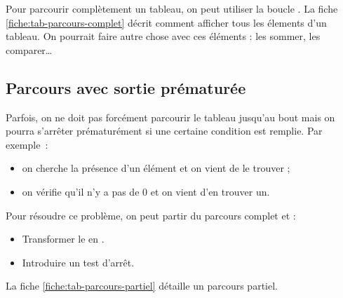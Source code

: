 			Pour parcourir complètement un tableau, 
			on peut utiliser la boucle .
			La fiche \vref{fiche:tab-parcours-complet}
			décrit comment afficher tous les élements d'un tableau.
			On pourrait faire autre chose avec ces éléments :
			les sommer, les comparer\dots
		
		\subsection{Parcours avec sortie prématurée}
		
			Parfois, on ne doit pas forcément parcourir 
			le tableau jusqu'au bout
			mais on pourra s'arrêter prématurément 
			si une certaine condition est remplie.
			Par exemple~:
			\begin{itemize}
			\item on cherche la présence d'un élément et on vient de le trouver ;
			\item on vérifie qu'il n'y a pas de $0$ et on vient d'en trouver un.
			\end{itemize}

			Pour résoudre ce problème,
			on peut partir du parcours complet et :
			\begin{itemize}
			\item
				Transformer le  en .
			\item
				Introduire un test d'arrêt.
			\end{itemize}
			La fiche \vref{fiche:tab-parcours-partiel}
			détaille un parcours partiel.
